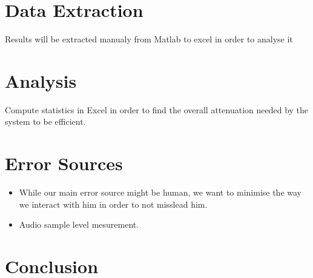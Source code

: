 \documentclass[12pt,a4paper]{article}
\begin{document}
\section{Data Extraction}

Results will be extracted manualy from Matlab to excel in order to analyse it

\vspace{1cm}
\section{Analysis}

Compute statistics in Excel in order to find the overall attenuation needed by the system to be efficient.
\vspace{1cm}

\section{Error Sources}
\begin{itemize}
\item While our main error source might be human, we want to minimise the way we interact with him in order to not misslead him.
\item Audio sample level mesurement.
\end{itemize}

\vspace{1cm}
\section{Conclusion}
\end{document}
